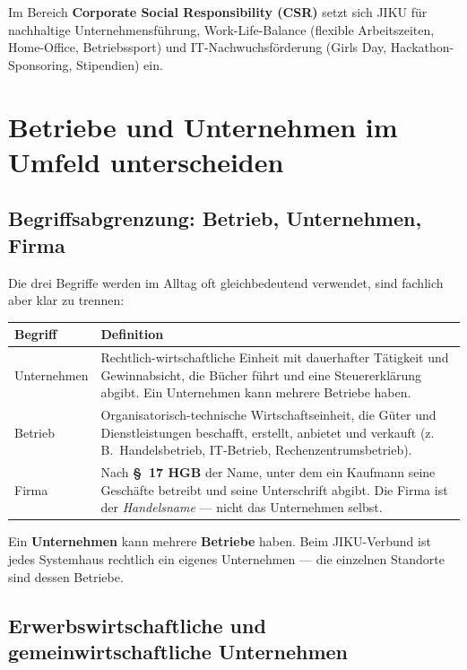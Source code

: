 \documentclass[11pt, a4paper]{article}
\begin{document}
Im Bereich \textbf{Corporate Social Responsibility (CSR)} setzt sich JIKU für nachhaltige Unternehmensführung,
Work-Life-Balance (flexible Arbeitszeiten, Home-Office, Betriebssport) und IT-Nachwuchsförderung
(Girls Day, Hackathon-Sponsoring, Stipendien) ein.

\section{Betriebe und Unternehmen im Umfeld unterscheiden}

\subsection{Begriffsabgrenzung: Betrieb, Unternehmen, Firma}

Die drei Begriffe werden im Alltag oft gleichbedeutend verwendet, sind fachlich aber klar zu trennen:

\begin{center}
\begin{tabular}{p{3cm} p{10cm}}
\toprule
\textbf{Begriff} & \textbf{Definition}\\
\midrule
Unternehmen & Rechtlich-wirtschaftliche Einheit mit dauerhafter Tätigkeit und Gewinnabsicht,
die Bücher führt und eine Steuererklärung abgibt. Ein Unternehmen kann mehrere
Betriebe haben.\\
\addlinespace
Betrieb & Organisatorisch-technische Wirtschaftseinheit, die Güter und Dienstleistungen
beschafft, erstellt, anbietet und verkauft (z.\,B.\ Handelsbetrieb, IT-Betrieb,
Rechenzentrumsbetrieb).\\
\addlinespace
Firma & Nach \textbf{§~17 HGB} der Name, unter dem ein Kaufmann seine Geschäfte betreibt
und seine Unterschrift abgibt. Die Firma ist der \emph{Handelsname} --- nicht das
Unternehmen selbst.\\
\bottomrule
\end{tabular}
\end{center}

\begin{merksatz}[title={\bfseries Merke: Unternehmen und Betrieb}]
Ein \textbf{Unternehmen} kann mehrere \textbf{Betriebe} haben. Beim JIKU-Verbund ist jedes
Systemhaus rechtlich ein eigenes Unternehmen --- die einzelnen Standorte sind dessen Betriebe.
\end{merksatz}

\subsection{Erwerbswirtschaftliche und gemeinwirtschaftliche Unternehmen}
\end{document}
